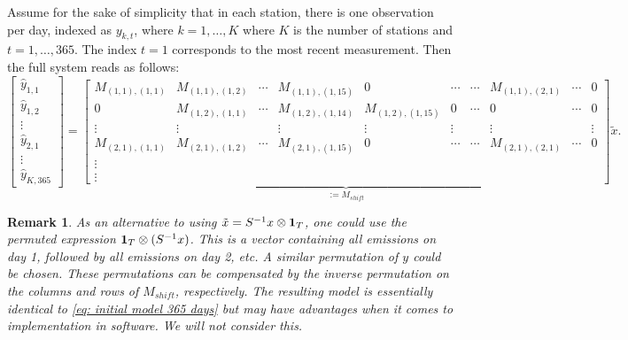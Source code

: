 \documentclass{article}
\newtheorem{remark}[proposition]{Remark}
\begin{document}
Assume for the sake of simplicity that in each station, there is one observation per day, indexed as $y_{k,t}$, where $k = 1,\dots,K$ where $K$ is the number of stations and $t = 1,\dots,365$. The index $t=1$ corresponds to the most recent measurement. Then the full system reads as follows:
\begin{equation}
    \label{eq: initial model 365 days}
\begin{bmatrix}
    \hat{y}_{1,1} \\
    \hat{y}_{1,2} \\
    \vdots \\
    \hat{y}_{2,1} \\ 
    \vdots \\
    \hat{y}_{K,365}
\end{bmatrix}
=
\underbrace{
\begin{bmatrix}
    M_{(1,1), (1,1)} & M_{(1,1), (1,2)} & \cdots & M_{(1,1),(1,15)} & 0 & \cdots & \cdots & M_{(1,1), (2,1)} & \cdots & 0 \\
    0 & M_{(1,2), (1,1)} & \cdots & M_{(1,2), (1,14)} & M_{(1,2), (1,15)} & 0 & \cdots & 0 & \cdots & 0 \\
    \vdots & \vdots & & \vdots & \vdots & \vdots & & \vdots & & \vdots \\
    M_{(2,1), (1,1)} & M_{(2,1), (1,2)} & \cdots & M_{(2,1),(1,15)} & 0 & \cdots & \cdots & M_{(2,1), (2,1)} & \cdots & 0 \\
    \vdots \\
    \vdots
\end{bmatrix}
}_{ := M_{shift}}
\tilde{x}
.\end{equation}

\begin{remark}
    As an alternative to using $\tilde{x} = S^{-1} x \otimes \vb{1}_T$, one could use the permuted expression $\vb{1}_{T} \otimes (S^{-1} x)$. This is a vector containing all emissions on day 1, followed by all emissions on day 2, etc. A similar permutation of $y$ could be chosen. These permutations can be compensated by the inverse permutation on the columns and rows of $M_{shift}$, respectively. The resulting model is essentially identical to \cref{eq: initial model 365 days} but may have advantages when it comes to implementation in software. We will not consider this.
\end{remark}
\end{document}
